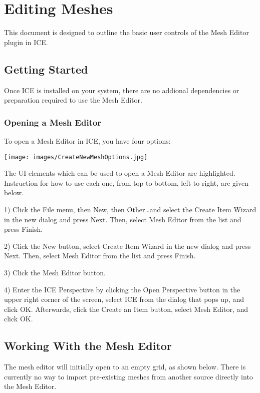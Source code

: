\section{Editing Meshes}

This document is designed to outline the basic user controls of the Mesh Editor plugin in ICE.

\subsection{Getting Started}

Once ICE is installed on your system, there are no addional dependencies or
preparation required to use the Mesh Editor.

\subsubsection{Opening a Mesh Editor}

To open a Mesh Editor in ICE, you have four options:
 

\begin{center}
\texttt{[image: images/CreateNewMeshOptions.jpg]}
\end{center}

The UI elements which can be used to open a Mesh Editor are
highlighted. Instruction for how to use each one, from top to bottom, left to
right, are given below.

 
1) Click the File menu, then New, then Other\ldots and select the Create Item
Wizard in the new dialog and press Next. Then, select Mesh Editor from the list
and press Finish.

 
2) Click the New button, select Create Item Wizard in the new dialog and
press Next. Then, select Mesh Editor from the list and press Finish.


3) Click the Mesh Editor button.


4) Enter the ICE Perspective by clicking the Open Perspective button in the
upper right corner of the screen, select ICE from the dialog that pops up, and
click OK. Afterwards, click the Create an Item button, select Mesh Editor, and
click OK.

\subsection{Working With the Mesh Editor}

The mesh editor will initially open to an empty grid, as shown below. There is
currently no way to import pre-existing meshes from another source directly
into the Mesh Editor.

